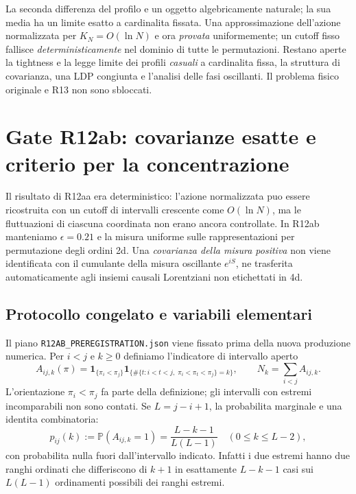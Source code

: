 \documentclass[11pt,a4paper]{article}
\begin{document}
La seconda differenza del profilo e un oggetto algebricamente naturale; la sua media ha un limite esatto a cardinalita fissata. Una approssimazione dell'azione normalizzata per $K_N=O(\ln N)$ e ora \emph{provata} uniformemente; un cutoff fisso fallisce \emph{deterministicamente} nel dominio di tutte le permutazioni. Restano aperte la tightness e la legge limite dei profili \emph{casuali} a cardinalita fissa, la struttura di covarianza, una LDP congiunta e l'analisi delle fasi oscillanti. Il problema fisico originale e R13 non sono sbloccati.



\section{Gate R12ab: covarianze esatte e criterio per la concentrazione}
\label{sec:r12ab}

Il risultato di R12aa era deterministico: l'azione normalizzata puo essere ricostruita con un cutoff di intervalli crescente come $O(\ln N)$, ma le fluttuazioni di ciascuna coordinata non erano ancora controllate. In R12ab manteniamo $\epsilon=0.21$ e la misura uniforme sulle rappresentazioni per permutazione degli ordini 2d. Una \emph{covarianza della misura positiva} non viene identificata con il cumulante della misura oscillante $e^{iS}$, ne trasferita automaticamente agli insiemi causali Lorentziani non etichettati in 4d.

\subsection{Protocollo congelato e variabili elementari}

Il piano \texttt{R12AB\_PREREGISTRATION.json} viene fissato prima della nuova produzione numerica. Per $i<j$ e $k\ge0$ definiamo l'indicatore di intervallo aperto
\begin{equation}
A_{ij,k}(\pi)=\mathbf1_{\{\pi_i<\pi_j\}}
\mathbf1_{\{\#\{t:i<t<j,\;\pi_i<\pi_t<\pi_j\}=k\}},
\qquad N_k=\sum_{i<j}A_{ij,k}.
\label{eq:r12ab_indicator}
\end{equation}
L'orientazione $\pi_i<\pi_j$ fa parte della definizione; gli intervalli con estremi incomparabili non sono contati. Se $L=j-i+1$, la probabilita marginale e una identita combinatoria:
\begin{equation}
\boxed{p_{ij}(k):=\mathbb P(A_{ij,k}=1)=\frac{L-k-1}{L(L-1)}}
\quad(0\le k\le L-2),
\label{eq:r12ab_marginal}
\end{equation}
con probabilita nulla fuori dall'intervallo indicato. Infatti i due estremi hanno due ranghi ordinati che differiscono di $k+1$ in esattamente $L-k-1$ casi sui $L(L-1)$ ordinamenti possibili dei ranghi estremi.
\end{document}
